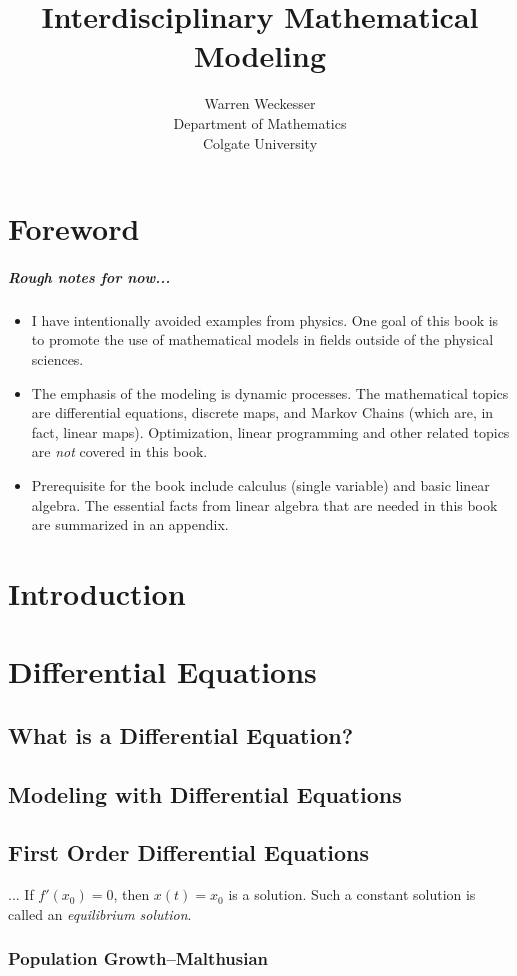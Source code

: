 \documentclass{book}
\title{\textbf{Interdisciplinary Mathematical Modeling}}
\author{Warren Weckesser\\
Department of Mathematics\\
Colgate University}
\begin{document}
\maketitle
\tableofcontents
%
\chapter*{Foreword}
\paragraph{Rough notes for now...}
\begin{itemize}
\item  I have intentionally avoided examples from physics.
One goal of this book is
to promote the use of mathematical models in fields outside of the
physical sciences.
\item The emphasis of the modeling is dynamic processes.
The mathematical topics are differential equations, discrete maps,
and Markov Chains (which are, in fact, linear maps).
Optimization, linear programming and other related topics
are \emph{not} covered in this book.
\item Prerequisite for the book include calculus (single variable)
and basic linear algebra.  The essential facts from linear algebra that
are needed in this book are summarized in an appendix.
\end{itemize}
%
\chapter{Introduction}
%
\chapter{Differential Equations}
\section{What is a Differential Equation?}
\section{Modeling with Differential Equations}
\section{First Order Differential Equations}
...
\medskip
\noindent
If  $f'(x_{0})=0$, then $x(t)=x_{0}$ is a solution.  Such a constant
solution is called an \emph{equilibrium solution}.
\subsection{Population Growth--Malthusian}
\end{document}
